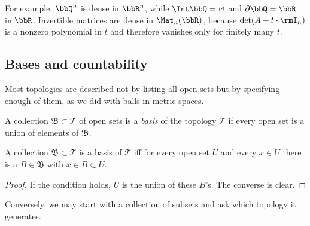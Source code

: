 For example, $\bbQ^n$ is dense in $\bbR^n$, while $\Int\bbQ=\varnothing$ and $\partial\bbQ=\bbR$ in $\bbR$. Invertible matrices are dense in $\Mat_n(\bbR)$, because $\det(A+t\cdot\rmI_n)$ is a nonzero polynomial in $t$ and therefore vanishes only for finitely many $t$.

\subsection{Bases and countability}

Most topologies are described not by listing all open sets but by specifying enough of them, as we did with balls in metric spaces.

\begin{defn}[Basis]
    A collection $\mathfrak{B}\subset\mathcal{T}$ of open sets is a \emph{basis} of the topology $\mathcal{T}$ if every open set is a union of elements of $\mathfrak{B}$.
\end{defn}

\begin{prop}\label{characterization of topology using basis}
    A collection $\mathfrak{B}\subset\mathcal{T}$ is a basis of $\mathcal{T}$ iff for every open set $U$ and every $x\in U$ there is a $B\in\mathfrak{B}$ with $x\in B\subset U$.
\end{prop}
\begin{proof}
    If the condition holds, $U$ is the union of these $B$'s. The converse is clear.
\end{proof}

Conversely, we may start with a collection of subsets and ask which topology it generates.


